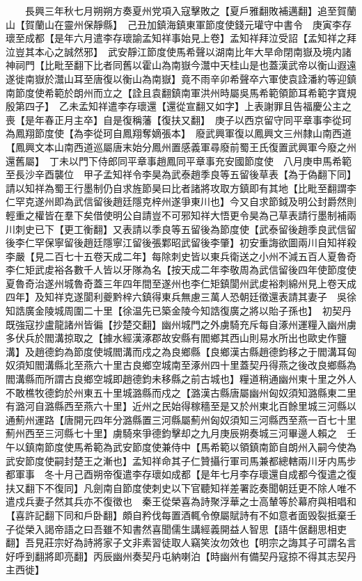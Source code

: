 　　長興三年秋七月朔朔方奏夏州党項入寇擊敗之【夏戶雅翻敗補邁翻】追至賀蘭山【賀蘭山在靈州保靜縣】　己丑加鎮海鎮東軍節度使錢元瓘守中書令　庚寅李存瓌至成都【是年六月遣李存瓌諭孟知祥事始見上卷】孟知祥拜泣受詔【孟知祥之拜泣豈其本心之誠然邪】　武安靜江節度使馬希聲以湖南比年大旱命閉南嶽及境内諸神祠門【比毗至翻下比者同舊以霍山為南嶽今灊中天桂山是也蓋漢武帝以衡山遐遠遂徙南嶽於灊山耳至唐復以衡山為南嶽】竟不雨辛卯希聲卒六軍使袁詮潘約等迎鎮南節度使希範於朗州而立之【詮且袁翻鎮南軍洪州時屬吳馬希範領節耳希範字寶規殷第四子】　乙未孟知祥遣李存瓌還【還從宣翻又如字】上表謝罪且告福慶公主之喪【是年春正月主卒】自是復稱藩【復扶又翻】　庚子以西京留守同平章事李從珂為鳳翔節度使【為李從珂自鳳翔奪嫡張本】　廢武興軍復以鳳興文三州隸山南西道【鳳興文本山南西道巡屬唐末始分鳳州置感義軍尋廢前蜀王氏復置武興軍今廢之州還舊屬】　丁未以門下侍郎同平章事趙鳳同平章事充安國節度使　八月庚申馬希範至長沙辛酉襲位　甲子孟知祥令李昊為武泰趙季良等五留後草表【為于偽翻下同】請以知祥為蜀王行墨制仍自求旌節昊曰比者諸將攻取方鎮即有其地【比毗至翻謂李仁罕克遂州即為武信留後趙廷隱克梓州遂爭東川也】今又自求節鉞及明公封爵然則輕重之權皆在羣下矣借使明公自請豈不可邪知祥大悟更令昊為己草表請行墨制補兩川刺史已下【更工衡翻】又表請以季良等五留後為節度使【武泰留後趙季良武信留後李仁罕保寧留後趙廷隱寧江留後張鄴昭武留後李肇】初安重誨欲圖兩川自知祥殺李嚴【見二百七十五卷天成二年】每除刺史皆以東兵衛送之小州不減五百人夏魯奇李仁矩武䖍裕各數千人皆以牙隊為名【按天成二年李敬周為武信留後四年使節度使夏魯奇治遂州城魯奇蓋三年四年間至遂州也李仁矩鎮閬州武䖍裕刺綿州見上卷天成四年】及知祥克遂閬利夔黔梓六鎮得東兵無慮三萬人恐朝廷徵還表請其妻子　吳徐知誥廣金陵城周圍二十里【徐温先已築金陵今知誥復廣之將以貽子孫也】　初契丹既強寇抄盧龍諸州皆徧【抄楚交翻】幽州城門之外虜騎充斥每自涿州運糧入幽州虜多伏兵於閻溝掠取之【據水經漢涿郡故安縣有閻鄉其西山則易水所出也歐史作鹽溝】及趙德鈞為節度使城閻溝而戍之為良鄉縣【良鄉漢古縣趙德鈞移之于閻溝耳匈奴須知閻溝縣北至燕六十里古良鄉空城南至涿州四十里蓋契丹得燕之後改良鄉縣為閻溝縣而所謂古良鄉空城即趙德鈞未移縣之前古城也】糧道稍通幽州東十里之外人不敢樵牧德鈞於州東五十里城潞縣而戍之【潞漢古縣唐屬幽州匈奴須知潞縣東二里有潞河自潞縣西至燕六十里】近州之民始得稼穡至是又於州東北百餘里城三河縣以通薊州運路【唐開元四年分潞縣置三河縣屬薊州匈奴須知三河縣西至燕一百七十里薊州西至三河縣七十里】虜騎來爭德鈞擊却之九月庚辰朔奏城三河畢邊人賴之　壬午以鎮南節度使馬希範為武安節度使兼侍中【馬希範以領鎮南節自朗州入嗣今使為武安節度使嗣封楚王之漸也】孟知祥命其子仁贊攝行軍司馬兼都總轄兩川牙内馬步都軍事　冬十月己酉朔帝復遣李存瓌如成都【是年七月李存瓌還自成都今復遣之復扶又翻下不復同】凡劍南自節度使刺史以下官聽知祥差署訖奏聞朝廷更不除人唯不遣戍兵妻子然其兵亦不復徵也　秦王從榮喜為詩聚浮華之士高輦等於幕府與相唱和【喜許記翻下同和戶卧翻】頗自矜伐每置酒輒令僚屬賦詩有不如意者面毁裂抵棄壬子從榮入謁帝語之曰吾雖不知書然喜聞儒生講經義開益人智思【語牛倨翻思相吏翻】吾見莊宗好為詩將家子文非素習徒取人竊笑汝勿效也【明宗之誨其子可謂名言好呼到翻將即亮翻】丙辰幽州奏契丹屯納喇泊【時幽州有備契丹寇掠不得其志契丹主西徙】

